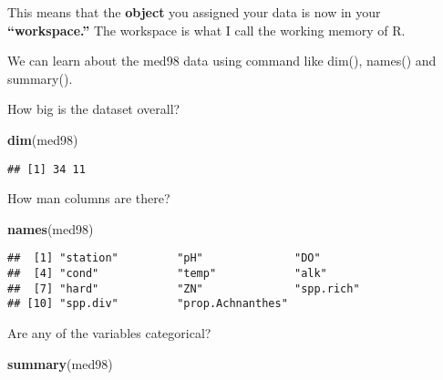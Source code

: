 \documentclass[]{book}
\newenvironment{Shaded}{\begin{snugshade}}{\end{snugshade}}
\newcommand{\KeywordTok}[1]{\textcolor[rgb]{0.13,0.29,0.53}{\textbf{#1}}}
\newcommand{\NormalTok}[1]{#1}
\theoremstyle{definition}
\theoremstyle{definition}
\theoremstyle{definition}
\theoremstyle{remark}
\begin{document}
This means that the \textbf{object} you assigned your data is now in
your \textbf{``workspace.''} The workspace is what I call the working
memory of R.

We can learn about the med98 data using command like dim(), names() and
summary().

How big is the dataset overall?

\begin{Shaded}
\begin{Highlighting}[]
\KeywordTok{dim}\NormalTok{(med98)}
\end{Highlighting}
\end{Shaded}

\begin{verbatim}
## [1] 34 11
\end{verbatim}

How man columns are there?

\begin{Shaded}
\begin{Highlighting}[]
\KeywordTok{names}\NormalTok{(med98)}
\end{Highlighting}
\end{Shaded}

\begin{verbatim}
##  [1] "station"         "pH"              "DO"             
##  [4] "cond"            "temp"            "alk"            
##  [7] "hard"            "ZN"              "spp.rich"       
## [10] "spp.div"         "prop.Achnanthes"
\end{verbatim}

Are any of the variables categorical?

\begin{Shaded}
\begin{Highlighting}[]
\KeywordTok{summary}\NormalTok{(med98)}
\end{Highlighting}
\end{Shaded}
\end{document}
